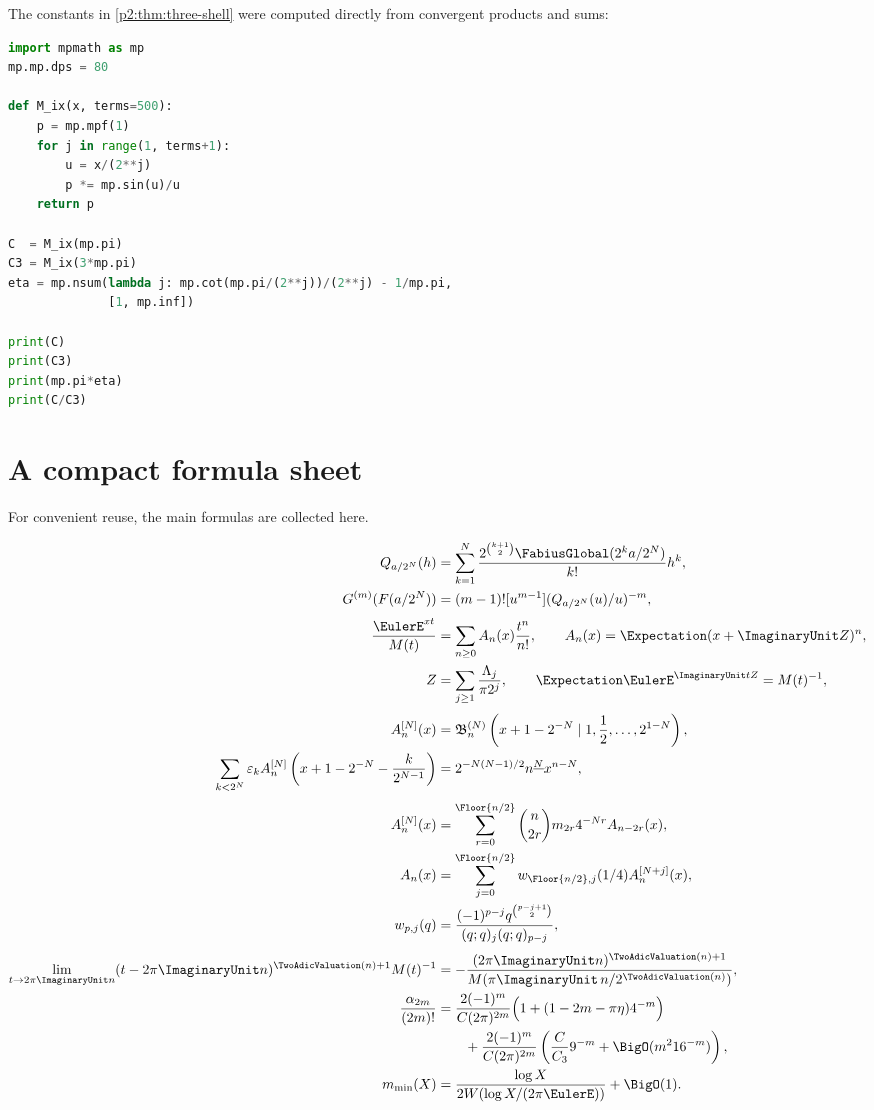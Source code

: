 \documentclass[11pt,oneside]{article}
\numberwithin{equation}{section}
\theoremstyle{definition}
\theoremstyle{remark}
\newcommand{\eps}{\varepsilon}
\begin{document}
The constants in \cref{p2:thm:three-shell} were computed directly from convergent products and sums:
\begin{lstlisting}[style=frontiercode,language=Python,caption={High-precision evaluation of the pole constants.}]
import mpmath as mp
mp.mp.dps = 80

def M_ix(x, terms=500):
    p = mp.mpf(1)
    for j in range(1, terms+1):
        u = x/(2**j)
        p *= mp.sin(u)/u
    return p

C  = M_ix(mp.pi)
C3 = M_ix(3*mp.pi)
eta = mp.nsum(lambda j: mp.cot(mp.pi/(2**j))/(2**j) - 1/mp.pi,
              [1, mp.inf])

print(C)
print(C3)
print(mp.pi*eta)
print(C/C3)
\end{lstlisting}

\section{A compact formula sheet}
\label{p2:app:formula-sheet}

For convenient reuse, the main formulas are collected here.

\begin{align*}
 Q_{a/2^N}(h)
 &=\sum_{k=1}^{N}
 \frac{2^{\binom{k+1}{2}}\FabiusGlobal(2^ka/2^N)}{k!}h^k,\\
 G^{(m)}(F(a/2^N))
 &=(m-1)![u^{m-1}](Q_{a/2^N}(u)/u)^{-m},\\[0.3em]
 \frac{\EulerE^{xt}}{M(t)}
 &=\sum_{n\ge0}A_n(x)\frac{t^n}{n!},
 \qquad
 A_n(x)=\Expectation(x+\ImaginaryUnit Z)^n,\\
 Z&=\sum_{j\ge1}\frac{\Lambda_j}{\pi2^j},
 \qquad
 \Expectation\EulerE^{\ImaginaryUnit tZ}=M(t)^{-1},\\[0.3em]
 A_n^{[N]}(x)
 &=\mathfrak B_n^{(N)}
 \left(x+1-2^{-N}\mid1,\frac12,\ldots,2^{1-N}\right),\\
 \sum_{k<2^N}\eps_k
 A_n^{[N]}\left(x+1-2^{-N}-\frac{k}{2^{N-1}}\right)
 &=2^{-N(N-1)/2}\fall nN x^{n-N},\\[0.3em]
 A_n^{[N]}(x)
 &=\sum_{r=0}^{\Floor{n/2}}
 \binom n{2r}m_{2r}4^{-Nr}A_{n-2r}(x),\\
 A_n(x)
 &=\sum_{j=0}^{\Floor{n/2}}
 w_{\Floor{n/2},j}(1/4)A_n^{[N+j]}(x),\\
 w_{p,j}(q)
 &=\frac{(-1)^{p-j}q^{\binom{p-j+1}{2}}}
 {(q;q)_j(q;q)_{p-j}},\\[0.3em]
 \lim_{t\to2\pi\ImaginaryUnit n}(t-2\pi\ImaginaryUnit n)^{\TwoAdicValuation(n)+1}M(t)^{-1}
 &=-\frac{(2\pi\ImaginaryUnit n)^{\TwoAdicValuation(n)+1}}
 {M(\pi\ImaginaryUnit\,n/2^{\TwoAdicValuation(n)})},\\
 \frac{\alpha_{2m}}{(2m)!}
 &=\frac{2(-1)^m}{C(2\pi)^{2m}}
 \Bigl(1+(1-2m-\pi\eta)4^{-m}\Bigr)\\
 &\qquad+\frac{2(-1)^m}{C(2\pi)^{2m}}
 \left(\frac C{C_3}9^{-m}+\BigO(m^2 16^{-m})\right),\\
 m_{\min}(X)
 &=\frac{\log X}{2W(\log X/(2\pi\EulerE))}+\BigO(1).
\end{align*}
\end{document}
